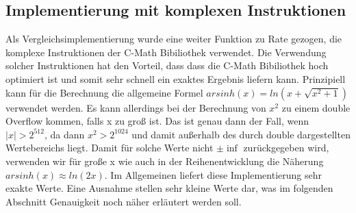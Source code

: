 \documentclass[course=erap] {aspdoc}
\begin{document}
    

    \subsection{Implementierung mit komplexen Instruktionen}
    
    Als Vergleichsimplementierung wurde eine weiter Funktion zu Rate gezogen, die komplexe Instruktionen der C-Math Bibiliothek verwendet. Die Verwendung solcher Instruktionen hat den Vorteil, dass dass die C-Math Bibiliothek hoch optimiert ist und somit sehr schnell ein exaktes Ergebnis liefern kann. Prinzipiell kann für die Berechnung die allgemeine Formel $ arsinh(x) = ln \left(x + \sqrt{x^2 + 1} \right)$ verwendet werden. Es kann allerdings bei der Berechnung von $x^2$ zu einem double Overflow kommen, falls x zu groß ist. Das ist genau dann der Fall, wenn $|x| > 2^{512}$, da dann $x^2 > 2^{1024}$ und damit außerhalb des durch double dargestellten Wertebereichs liegt. Damit für solche Werte nicht $\pm \inf$ zurückgegeben wird, verwenden wir für große x wie auch in der Reihenentwicklung die Näherung $arsinh(x)\approx ln(2x)$. Im Allgemeinen liefert diese Implementierung sehr exakte Werte. Eine Ausnahme stellen sehr kleine Werte dar, was im folgenden Abschnitt Genauigkeit noch näher erläutert werden soll.
\end{document}
